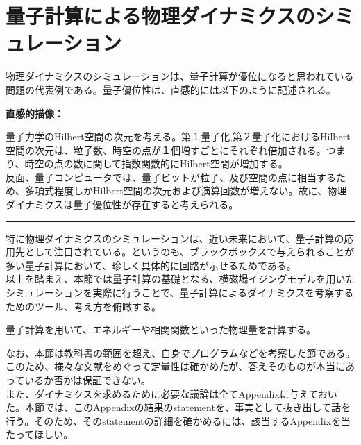 \documentclass[a4paper,10.5pt]{article}
\numberwithin{equation}{section}
\newenvironment{intuitionbox}
{\begin{prooflabel}\textbf{直感的描像：}\end{prooflabel}\vspace{0.8em}}
{\par\vspace{1em}\hrule\vspace{1em}}
\begin{document}
\section{量子計算による物理ダイナミクスのシミュレーション}
物理ダイナミクスのシミュレーションは、量子計算が優位になると思われている問題の代表例である。量子優位性は、直感的には以下のように記述される。
\begin{intuitionbox}
量子力学のHilbert空間の次元を考える。第１量子化,第２量子化におけるHilbert空間の次元は、粒子数、時空の点が１個増すごとにそれぞれ倍加される。つまり、時空の点の数に関して指数関数的にHilbert空間が増加する。\\
反面、量子コンピュータでは、量子ビットが粒子、及び空間の点に相当するため、多項式程度しかHilbert空間の次元および演算回数が増えない。故に、物理ダイナミクスは量子優位性が存在すると考えられる。
\end{intuitionbox}
特に物理ダイナミクスのシミュレーションは、近い未来において、量子計算の応用先として注目されている。というのも、ブラックボックスで与えられることが多い量子計算において、珍しく具体的に回路が示せるためである。\\
以上を踏まえ、本節では量子計算の基礎となる、横磁場イジングモデルを用いたシミュレーションを実際に行うことで、量子計算によるダイナミクスを考察するためのツール、考え方を俯瞰する。
\begin{goalbox}
量子計算を用いて、エネルギーや相関関数といった物理量を計算する。
\end{goalbox}
なお、本節は教科書の範囲を超え、自身でプログラムなどを考察した節である。このため、様々な文献をめぐって定量性は確かめたが、答えそのものが本当にあっているか否かは保証できない。\\
また、ダイナミクスを求めるために必要な議論は全てAppendixに与えておいた。本節では、このAppendixの結果のstatementを、事実として抜き出して話を行う。そのため、そのstatementの詳細を確かめるには、該当するAppendixを当たってほしい。
 
\end{document}
